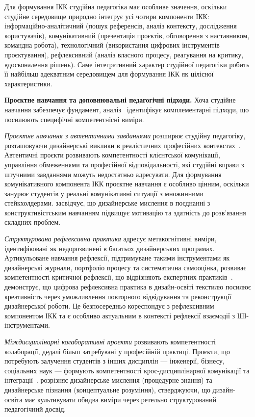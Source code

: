 Для формування ІКК студійна педагогіка має особливе значення, оскільки студійне середовище природно інтегрує усі чотири компоненти ІКК: інформаційно-аналітичний (пошук референсів, аналіз контексту, дослідження користувачів), комунікативний (презентація проєктів, обговорення з наставником, командна робота), технологічний (використання цифрових інструментів проєктування), рефлексивний (аналіз власного процесу, реагування на критику, вдосконалення рішень). Саме інтегративний характер студійної педагогіки робить її найбільш адекватним середовищем для формування ІКК як цілісної характеристики.

\textbf{Проєктне навчання та доповнювальні педагогічні підходи.} Хоча студійне навчання забезпечує фундамент, аналіз~\cite{Musiienko2025DesignEducation} ідентифікує комплементарні підходи, що посилюють специфічні компетентнісні виміри.

\emph{Проєктне навчання з автентичними завданнями} розширює студійну педагогіку, розташовуючи дизайнерські виклики в реалістичних професійних контекстах~\cite{Kamalipour2022}. Автентичні проєкти розвивають компетентності клієнтської комунікації, управління обмеженнями та професійної відповідальності, які студійні вправи з штучними завданнями можуть недостатньо адресувати. Для формування комунікативного компонента ІКК проєктне навчання є особливо цінним, оскільки занурює студентів у реальні комунікативні ситуації з множинними стейкхолдерами. \citet{Tsai2023} засвідчує, що дизайнерське мислення в поєднанні з конструктивістським навчанням підвищує мотивацію та здатність до розв'язання складних проблем.

\emph{Структурована рефлексивна практика} адресує метакогнітивні виміри, ідентифіковані як недорозвинені в багатьох дизайнерських програмах. Артикульоване навчання рефлексії, підтримуване такими інструментами як дизайнерські журнали, портфоліо процесу та систематична самооцінка, розвиває компетентності критичної рефлексії, що відрізняють експертних практиків~\cite{Hameed2023310}. \citet{Hameed2023310} демонструє, що цифрова рефлексивна практика в дизайн-освіті текстилю посилює креативність через уможливлення повторного відвідування та реконструкції дизайнерської роботи. Це безпосередньо кореспондує з рефлексивним компонентом ІКК та є особливо актуальним в контексті рефлексії взаємодії з ШІ-інструментами.

\emph{Міждисциплінарні колаборативні проєкти} розвивають компетентності колаборації, дедалі більш затребувані у професійній практиці. Проєкти, що потребують залучення студентів з інших дисциплін --- інженерії, бізнесу, соціальних наук --- формують компетентності крос-дисциплінарної комунікації та інтеграції~\cite{Chon2019187}. \citet{Chon2019187} розрізняє дизайнерське мислення (процедурне знання) та дизайнерське пізнання (концептуальне розуміння), стверджуючи, що дизайн-освіта має культивувати обидва виміри через ретельно структурований педагогічний досвід.

